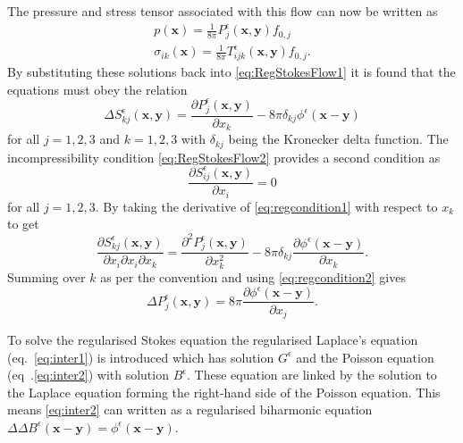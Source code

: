 The pressure and stress tensor associated with this flow can now be written as
\begin{gather}
\label{eq:regpressuresol}
    p(\bm{x}) = \frac{1}{8\pi}P^\epsilon_{j}(\bm{x},\bm{y})f_{0,j}\\
\label{eq:regstresssol}
    \sigma_{ik}(\bm{x}) = \frac{1}{8\pi}T^\epsilon_{ijk}(\bm{x},\bm{y})f_{0,j}.
\end{gather}
By substituting these solutions back into \cref{eq:RegStokesFlow1} it is found that the equations must obey the relation
\begin{equation}
\label{eq:regcondition1}
    \Delta S^\epsilon_{kj}(\bm{x},\bm{y}) = \frac{\partial P^\epsilon_{j}(\bm{x},\bm{y})}{\partial x_k} - 8\pi\delta_{kj}\phi^\epsilon(\bm{x}-\bm{y})
\end{equation}
for all $j=1,2,3$ and $k=1,2,3$ with $\delta_{kj}$ being the Kronecker delta function. The incompressibility condition \cref{eq:RegStokesFlow2} provides a second condition as
\begin{equation}
\label{eq:regcondition2}
    \frac{\partial S^\epsilon_{ij}(\bm{x},\bm{y})}{\partial x_i} = 0
\end{equation}
for all $j=1,2,3$. By taking the derivative of \cref{eq:regcondition1} with respect to $x_k$ to get
\begin{equation*}
    \frac{\partial S^\epsilon_{kj}(\bm{x},\bm{y})}{\partial x_i \partial x_i \partial x_k} = \frac{\partial^2 P^\epsilon_{j}(\bm{x},\bm{y})}{\partial x_k^2} - 8\pi\delta_{kj}\frac{\partial \phi^\epsilon(\bm{x}-\bm{y})}{\partial x_k}.
\end{equation*}
Summing over $k$ as per the convention and using \cref{eq:regcondition2} gives
\begin{equation}
\label{eq:regpressureeq}
    \Delta P^\epsilon_{j}(\bm{x},\bm{y}) = 8\pi\frac{\partial \phi^\epsilon(\bm{x}-\bm{y})}{\partial x_j}.
\end{equation}

To solve the regularised Stokes equation the regularised Laplace's equation (eq.~\ref{eq:inter1}) is introduced which has solution $G^\epsilon$ and the Poisson equation (eq~.\ref{eq:inter2}) with solution $B^\epsilon$. These equation are linked by the solution to the Laplace equation forming the right-hand side of the Poisson equation. This means \cref{eq:inter2} can written as a regularised biharmonic equation $\Delta \Delta B^\epsilon  (\bm{x}-\bm{y}) = \phi^\epsilon(\bm{x}-\bm{y})$.

